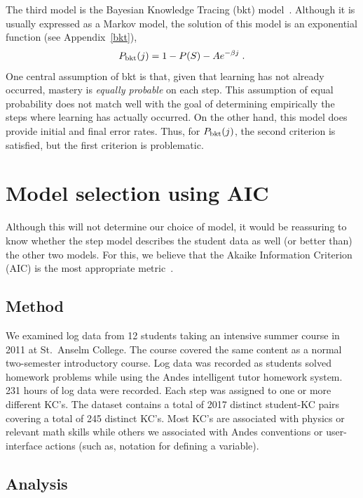 \documentclass[11pt,letterpaper]{article}
\begin{document}
The third model is the Bayesian Knowledge Tracing (bkt) model~\cite{anderson}.
Although it is usually expressed as a Markov model, the solution of
this model is an exponential function (see Appendix~\ref{bkt}),
%
\begin{equation}
         P_{\rm bkt}(j) = 1-P(S) -A e^{-\beta j} \; .
\end{equation}
%
One central assumption of bkt is that, given that learning
has not already occurred, mastery is {\em equally probable} on each step.
This assumption of equal probability does not match well with 
the goal of determining empirically the steps where learning has actually occurred.
On the other hand, this model does provide initial and final
error rates.  Thus, for $P_{\rm bkt}(j)$, the second criterion is 
satisfied, but the first criterion is problematic.

\section{Model selection using AIC}
\label{model-selection}

Although this will not determine our choice of model, it 
would be reassuring to know whether the step model 
describes the student data as well (or better than) the
other two models.  For this, we believe that the Akaike Information 
Criterion (AIC) is the most appropriate metric~\cite{akaike,aicbook}.

\subsection{Method}

We examined log data from 12 students taking an intensive
summer course in 2011 at St.\ Anselm College.  The course
covered the same content as a normal two-semester introductory
course.  Log data was recorded as students solved homework 
problems while using the Andes intelligent tutor homework system.
231 hours of log data were recorded.
Each step was assigned to one or more different KC's.  
The dataset contains a total of 2017 distinct
student-KC pairs covering a total of 245 distinct KC's.
Most KC's are associated with physics
or relevant math skills while others we associated with 
Andes conventions or user-interface actions (such as, notation
for defining a variable). 

\subsection{Analysis}
\end{document}

